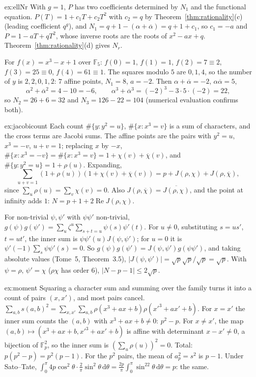 \begin{solution}{ex:ellNr}
\idea With $g=1$, $P$ has two coefficients determined by $N_1$ and the functional equation.
\writeup $P(T)=1+c_1T+c_2T^2$ with $c_2=q$ by Theorem~\ref{thm:rationality}(c) (leading coefficient $q^g$), and $N_1=q+1-(\alpha+\overline\alpha)=q+1+c_1$, so
$c_1=-a$ and $P=1-aT+qT^2$, whose inverse roots are the roots of $x^2-ax+q$. Theorem~\ref{thm:rationality}(d) gives $N_r$.

For $f(x)=x^3-x+1$ over $\mathbb F_5$: $f(0)=1$, $f(1)=1$, $f(2)=7\equiv2$, $f(3)=25\equiv0$, $f(4)=61\equiv1$. The squares modulo $5$ are $0,1,4$, so the number of $y$
is $2,2,0,1,2$: $7$ affine points, $N_1=8$, $a=-2$. Then $\alpha+\overline\alpha=-2$, $\alpha\overline\alpha=5$,
\[
\alpha^2+\overline\alpha^2=4-10=-6,\qquad\alpha^3+\overline\alpha^3=(-2)^3-3\cdot5\cdot(-2)=22,
\]
so $N_2=26+6=32$ and $N_3=126-22=104$ (numerical evaluation confirms both).
\end{solution}

\begin{solution}{ex:jacobicount}
\idea Each count $\#\{y:y^2=u\}$, $\#\{x:x^3=v\}$ is a sum of characters, and the cross terms are Jacobi sums.
\writeup The affine points are the pairs with $y^2=u$, $x^3=-v$, $u+v=1$; replacing $x$ by $-x$, $\#\{x:x^3=-v\}=\#\{x:x^3=v\}=1+\chi(v)+\overline\chi(v)$, and
$\#\{y:y^2=u\}=1+\rho(u)$. Expanding,
\[
\sum_{u+v=1}(1+\rho(u))(1+\chi(v)+\overline\chi(v))=p+J(\rho,\chi)+J(\rho,\overline\chi),
\]
since $\sum_u\rho(u)=\sum_v\chi(v)=0$. Also $J(\rho,\overline\chi)=\overline{J(\rho,\chi)}$, and the point at infinity adds $1$: $N=p+1+2\operatorname{Re}J(\rho,\chi)$.

For non-trivial $\psi,\psi'$ with $\psi\psi'$ non-trivial, $g(\psi)g(\psi')=\sum_u\zeta^u\sum_{s+t=u}\psi(s)\psi'(t)$. For $u\ne0$, substituting $s=us'$, $t=ut'$, the
inner sum is $\psi\psi'(u)J(\psi,\psi')$; for $u=0$ it is $\psi'(-1)\sum_s\psi\psi'(s)=0$. So $g(\psi)g(\psi')=J(\psi,\psi')g(\psi\psi')$, and taking absolute values
(Tome~5, Theorem~3.5), $|J(\psi,\psi')|=\sqrt p\sqrt p/\sqrt p=\sqrt p$. With $\psi=\rho$, $\psi'=\chi$ ($\rho\chi$ has order $6$), $|N-p-1|\le2\sqrt p$.
\end{solution}

\begin{solution}{ex:moment}
\idea Squaring a character sum and summing over the family turns it into a count of pairs $(x,x')$, and most pairs cancel.
\writeup $\sum_{a,b}s(a,b)^2=\sum_{x,x'}\sum_{a,b}\rho(x^3+ax+b)\rho(x'^3+ax'+b)$. For $x=x'$ the inner sum counts the $(a,b)$ with $x^3+ax+b\ne0$: $p^2-p$. For
$x\ne x'$, the map $(a,b)\mapsto(x^3+ax+b,x'^3+ax'+b)$ is affine with determinant $x-x'\ne0$, a bijection of $\mathbb F_p^2$, so the inner sum is
$(\sum_u\rho(u))^2=0$. Total: $p(p^2-p)=p^2(p-1)$. For the $p^2$ pairs, the mean of $a_p^2=s^2$ is $p-1$. Under Sato--Tate,
$\int_0^\pi4p\cos^2\theta\cdot\frac2\pi\sin^2\theta\,\mathrm d\theta=\frac{2p}\pi\int_0^\pi\sin^22\theta\,\mathrm d\theta=p$: the same.
\end{solution}

